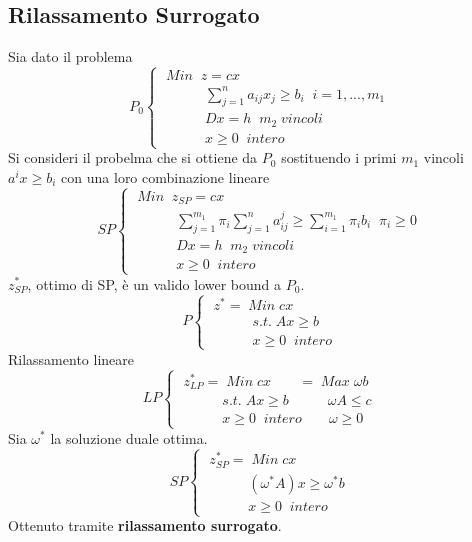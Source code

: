\subsection{Rilassamento Surrogato}
Sia dato il problema
\begin{displaymath}
P_{0}
\begin{cases}
\;Min\;\;z=cx\\
\;\;\;\;\;\;\;\;\;\;\;\displaystyle\sum_{j=1}^{n}a_{ij}x_{j}\ge b_{i}\;\;i=1,...,m_{1}\\
\;\;\;\;\;\;\;\;\;\;\;Dx=h\;\;m_{2}\;vincoli\\
\;\;\;\;\;\;\;\;\;\;\;x\ge 0\;\;intero
\end{cases}
\end{displaymath}
Si consideri il probelma che si ottiene da $P_{0}$ sostituendo i primi $m_{1}$ vincoli $a^{i}x\ge b_{i}$ con una loro combinazione lineare
\begin{displaymath}
SP
\begin{cases}
\;Min\;\;z_{SP}=cx\\
\;\;\;\;\;\;\;\;\;\;\;\displaystyle\sum_{j=1}^{m_{1}}\pi_{i}\displaystyle\sum_{j=1}^{n}a_{ij}^{j}\ge \displaystyle\sum_{i=1}^{m_{1}}\pi_{i}b_{i}\;\;\pi_{i}\ge 0\\
\;\;\;\;\;\;\;\;\;\;\;Dx=h\;\;m_{2}\;vincoli\\
\;\;\;\;\;\;\;\;\;\;\;x\ge 0\;\;intero
\end{cases}
\end{displaymath}
$z_{SP}^{*}$, ottimo di SP, è un valido lower bound a $P_{0}$.
\begin{displaymath}
P
\begin{cases}
\;z^{*}=\;Min\;cx\\
\;\;\;\;\;\;\;\;\;\;\;s.t.\;Ax\ge b\\
\;\;\;\;\;\;\;\;\;\;\;x\ge 0\;\;intero
\end{cases}
\end{displaymath}
Rilassamento lineare
\begin{displaymath}
LP
\begin{cases}
\;z_{LP}^{*}=\;Min\;cx\;\;\;\;\;\;\;=\;Max\;\omega b\\
\;\;\;\;\;\;\;\;\;\;\;s.t.\;Ax\ge b\;\;\;\;\;\;\;\;\;\;\omega A\le c\\
\;\;\;\;\;\;\;\;\;\;\;x\ge 0\;\;intero\;\;\;\;\;\;\;\omega \ge 0
\end{cases}
\end{displaymath}
Sia $\omega^{*}$ la soluzione duale ottima.
\begin{displaymath}
SP
\begin{cases}
\;z_{SP}^{*}=\;Min\;cx\\
\;\;\;\;\;\;\;\;\;\;\;(\omega^{*}A)x\ge\omega^{*}b\\
\;\;\;\;\;\;\;\;\;\;\;x\ge 0\;\;intero
\end{cases}
\end{displaymath}
Ottenuto tramite \textbf{rilassamento surrogato}.

